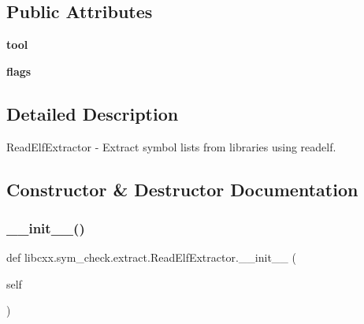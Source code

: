 \subsection*{Public Attributes}
\begin{DoxyCompactItemize}
\item 
\mbox{\label{classlibcxx_1_1sym__check_1_1extract_1_1_read_elf_extractor_a36a05a7636836894534c8f6a7c352879}} 
{\bfseries tool}
\item 
\mbox{\label{classlibcxx_1_1sym__check_1_1extract_1_1_read_elf_extractor_a61faf5a646f1fc8efa03ffc498de27dd}} 
{\bfseries flags}
\end{DoxyCompactItemize}


\subsection{Detailed Description}
\begin{DoxyVerb}ReadElfExtractor - Extract symbol lists from libraries using readelf.
\end{DoxyVerb}
 

\subsection{Constructor \& Destructor Documentation}
\mbox{\label{classlibcxx_1_1sym__check_1_1extract_1_1_read_elf_extractor_a007a016ce8a4182553bb78f572875f08}} 
\subsubsection{\texorpdfstring{\+\_\+\+\_\+init\+\_\+\+\_\+()}{\_\_init\_\_()}}
{\footnotesize\ttfamily def libcxx.\+sym\+\_\+check.\+extract.\+Read\+Elf\+Extractor.\+\_\+\+\_\+init\+\_\+\+\_\+ (\begin{DoxyParamCaption}\item[{}]{self }\end{DoxyParamCaption})}

